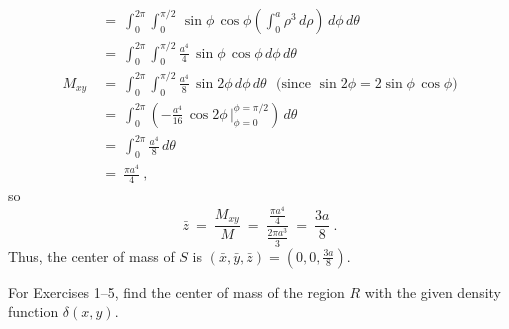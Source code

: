 \begin{exmp}
\begin{align*}
  &=~ \int_0^{2\pi} \int_0^{\pi /2} \,\sin \phi \,\cos \phi \left( \int_0^a \rho^3 \,d\rho \right) \,d\phi\,d\theta\\[8pt]
  &=~ \int_0^{2\pi} \int_0^{\pi /2} \tfrac{a^4}{4}\,\sin \phi\,\cos \phi\,d\phi\,d\theta\\[8pt]
  M_{xy} ~&=~ \int_0^{2\pi} \int_0^{\pi /2} \tfrac{a^4}{8}\,\sin 2\phi\,d\phi\,d\theta ~~~\text{(since $\sin 2\phi =
  2\sin \phi \, \cos \phi$)}\\[8pt]
  &=~ \int_0^{2\pi} \left(  -\tfrac{a^4}{16}\,\cos 2\phi\,\Big|_{\phi=0}^{\phi=\pi /2} \right) \,d\theta\\[8pt]
  &=~ \int_0^{2\pi} \tfrac{a^4}{8}\,d\theta\\
  &=~ \frac{\pi a^4}{4}~,
 \end{align*}
 so
 \begin{displaymath}
  \bar{z} ~=~ \frac{M_{xy}}{M} ~=~ \frac{\tfrac{\pi a^4}{4}}{\tfrac{2\pi a^3}{3}} ~=~ \frac{3a}{8} ~.
 \end{displaymath}
 Thus, the center of mass of $S$ is $(\bar{x},\bar{y},\bar{z}) = \left( 0,0,\frac{3a}{8} \right)$.
\end{exmp}
\startexercises\label{sec3dot6}
\par\noindent For Exercises 1--5, find the center of mass of the region $R$ with the given density function
$\delta(x,y)$.
